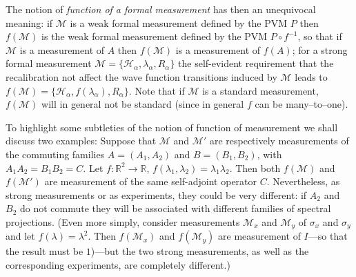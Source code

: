 \documentclass[12pt]{article}
\newcommand{\sa}{self-adjoint}
\newcommand{\wf}{wave function}
\renewcommand{\a}{\alpha}
\newcommand{\la}{\lambda_{\a}}
\newcommand{\Ha}{{\H}_{\a}}
\renewcommand{\H}{\mbox{$\mathcal{H}$}}
\newcommand{\Aa}{R_{\a}}
\newcommand{\R}{\mathbb{R}}
\newcommand{\M}{\mbox{$\mathcal{M}$}}
\begin{document}
The notion of \emph{function of a formal measurement} has then an
unequivocal meaning: if $\M$ is a weak formal measurement defined by
the PVM $P$ then $f(\M)$ is the weak formal measurement defined by the
PVM $P\circ f^{-1}$, so that if $\M$ is a measurement of $A$ then
$f(\M)$ is a measurement of $f(A)$; for a strong formal measurement
$\M=\{\Ha, \la, \Aa \}$ the self-evident requirement that the
recalibration not affect the \wf{} transitions induced by \M{} leads
to $ f(\M)= \{\Ha, f(\lambda_{\alpha}), \Aa \}$.  Note that if $\M$ is
a standard measurement, $f(\M)$ will in general not be standard (since
in general $f$ can be many--to--one).  \bigskip

To highlight some subtleties of the notion of function of measurement
we shall discuss two examples: Suppose that $\M$ and $\M'$ are
respectively measurements of the commuting families $A = (A_{1}, A_{
   2})$ and $ B = (B_{1}, B_{ 2})$, with $A_{1}A_{ 2}= B_{1}B_{ 2}=C$.
Let $f:\R^{2}\to\R$, $f (\lambda_{1}, \lambda_{2}) =
\lambda_{1}\lambda_{2}$.  Then both $f(\M)$ and $f(\M')$ are
measurement of the same \sa{} operator $C$.  Nevertheless, as strong
measurements or as experiments, they could be very different: if
$A_{2}$ and $B_{2}$ do not commute they will be associated with
different families of spectral projections. (Even more simply,
consider measurements $\M_x$ and $\M_y$ of $\sigma_x$ and $\sigma_y$
and let $f(\lambda)= \lambda^2$. Then $f(\M_x)$ and $f(\M_y)$ are
measurement of $I$---so that the result must be $1$)---but the two
strong measurements, as well as the corresponding experiments, are
completely different.)
\end{document}
